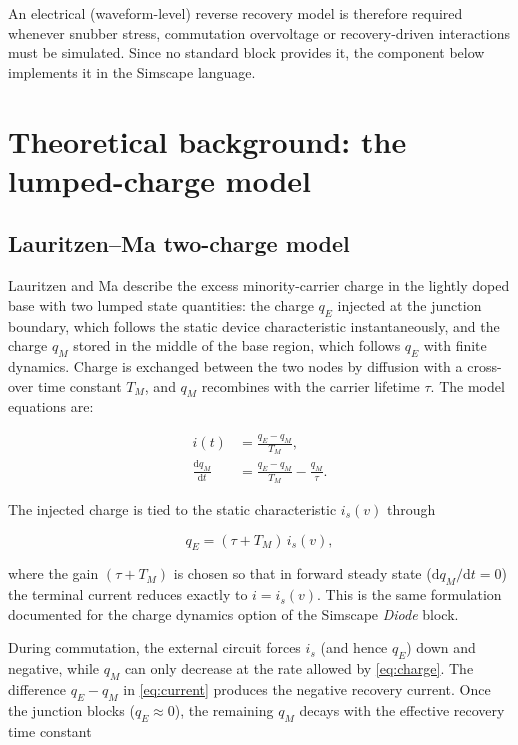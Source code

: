 \documentclass[11pt,a4paper]{article}
\begin{document}
An electrical (waveform-level) reverse recovery model is therefore required
whenever snubber stress, commutation overvoltage or recovery-driven
interactions must be simulated. Since no standard block provides it, the
component below implements it in the Simscape language.

\section{Theoretical background: the lumped-charge model}

\subsection{Lauritzen--Ma two-charge model}

Lauritzen and Ma \cite{lauritzen1991} describe the excess minority-carrier
charge in the lightly doped base with two lumped state quantities: the charge
$q_E$ injected at the junction boundary, which follows the static device
characteristic instantaneously, and the charge $q_M$ stored in the middle of
the base region, which follows $q_E$ with finite dynamics. Charge is exchanged
between the two nodes by diffusion with a cross-over time constant $T_M$, and
$q_M$ recombines with the carrier lifetime $\tau$. The model equations are:

\begin{align}
  i(t)                          &= \frac{q_E - q_M}{T_M}, \label{eq:current}\\
  \frac{\mathrm{d}q_M}{\mathrm{d}t} &= \frac{q_E - q_M}{T_M} - \frac{q_M}{\tau}. \label{eq:charge}
\end{align}

The injected charge is tied to the static characteristic $i_s(v)$ through

\begin{equation}
  q_E = (\tau + T_M)\, i_s(v), \label{eq:qE}
\end{equation}

where the gain $(\tau + T_M)$ is chosen so that in forward steady state
($\mathrm{d}q_M/\mathrm{d}t = 0$) the terminal current reduces exactly to
$i = i_s(v)$. This is the same formulation documented for the charge dynamics
option of the Simscape \emph{Diode} block.

During commutation, the external circuit forces $i_s$ (and hence $q_E$) down
and negative, while $q_M$ can only decrease at the rate allowed by
\eqref{eq:charge}. The difference $q_E - q_M$ in \eqref{eq:current} produces
the negative recovery current. Once the junction blocks ($q_E \approx 0$), the
remaining $q_M$ decays with the effective recovery time constant
\end{document}
